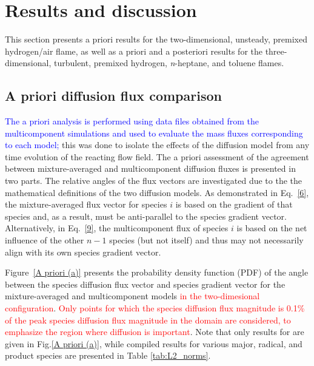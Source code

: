 \documentclass[preprint,review,12pt]{elsarticle}
\begin{document}
\section{Results and discussion}\label{sec:results}
This section presents a priori results for the two-dimensional, unsteady, premixed hydrogen/air flame, as well as a priori and a posteriori results for the three-dimensional, turbulent, premixed hydrogen, \textit{n}-heptane, and toluene flames.

\subsection{A priori diffusion flux comparison}\label{sec:aprioriresults}

\textcolor{blue}{The a priori analysis is performed using data files obtained from the multicomponent simulations and used to evaluate the mass fluxes corresponding to each model;} this was done to isolate the effects of the diffusion model from any time evolution of the reacting flow field.
The a priori assessment of the agreement between mixture-averaged and multicomponent diffusion fluxes is presented in two parts.
The relative angles of the flux vectors are investigated due to the the mathematical definitions of the two diffusion models. 
As demonstrated in Eq.~\eqref{6}, the mixture-averaged flux vector for species $i$ is based on the gradient of that species and, as a result, must be anti-parallel to the species gradient vector.
Alternatively, in Eq.~\eqref{9}, the multicomponent flux of species $i$ is based on the net influence of the other $n-1$ species (but not itself) and thus may not necessarily align with its own species gradient vector.

Figure~\ref{A priori (a)} presents the probability density function (PDF) of the angle between the species diffusion flux vector and species gradient vector for the mixture-averaged and multicomponent models \textcolor{red}{in the two-dimesional configuration}.
\textcolor{red}{Only points for which the species diffusion flux magnitude is 0.1\% of the peak species diffusion flux magnitude in the domain are considered, to emphasize the region where diffusion is important}.
Note that only results for  are given in Fig.\ref{A priori (a)}, while compiled results for various major, radical, and product species are presented in Table \ref{tab:L2_norms}.
\end{document}
